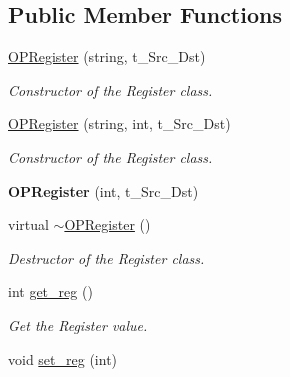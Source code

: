 \subsection*{\-Public \-Member \-Functions}
\begin{DoxyCompactItemize}
\item 
\hypertarget{classOPRegister_a896eb65f36bf615ccfa74541de23858f}{\hyperlink{classOPRegister_a896eb65f36bf615ccfa74541de23858f}{\-O\-P\-Register} (string, t\-\_\-\-Src\-\_\-\-Dst)}\label{classOPRegister_a896eb65f36bf615ccfa74541de23858f}

\begin{DoxyCompactList}\small\item\em \-Constructor of the \-Register class. \end{DoxyCompactList}\item 
\hypertarget{classOPRegister_ad75c23d1db7c149c20cbc8bb01c6df59}{\hyperlink{classOPRegister_ad75c23d1db7c149c20cbc8bb01c6df59}{\-O\-P\-Register} (string, int, t\-\_\-\-Src\-\_\-\-Dst)}\label{classOPRegister_ad75c23d1db7c149c20cbc8bb01c6df59}

\begin{DoxyCompactList}\small\item\em \-Constructor of the \-Register class. \end{DoxyCompactList}\item 
\hypertarget{classOPRegister_a3c9786680764ada47370d469790b8178}{{\bfseries \-O\-P\-Register} (int, t\-\_\-\-Src\-\_\-\-Dst)}\label{classOPRegister_a3c9786680764ada47370d469790b8178}

\item 
\hypertarget{classOPRegister_aedab3bc5a2eecd0d02771fb6b37d73fe}{virtual \hyperlink{classOPRegister_aedab3bc5a2eecd0d02771fb6b37d73fe}{$\sim$\-O\-P\-Register} ()}\label{classOPRegister_aedab3bc5a2eecd0d02771fb6b37d73fe}

\begin{DoxyCompactList}\small\item\em \-Destructor of the \-Register class. \end{DoxyCompactList}\item 
int \hyperlink{classOPRegister_a2e42d6407677a7be154a5d4d74f7a8e7}{get\-\_\-reg} ()
\begin{DoxyCompactList}\small\item\em \-Get the \-Register value. \end{DoxyCompactList}\item 
\hypertarget{classOPRegister_ab514f45a9957e9b485fee38f264a70cf}{void \hyperlink{classOPRegister_ab514f45a9957e9b485fee38f264a70cf}{set\-\_\-reg} (int)}\label{classOPRegister_ab514f45a9957e9b485fee38f264a70cf}


\end{DoxyCompactItemize}
